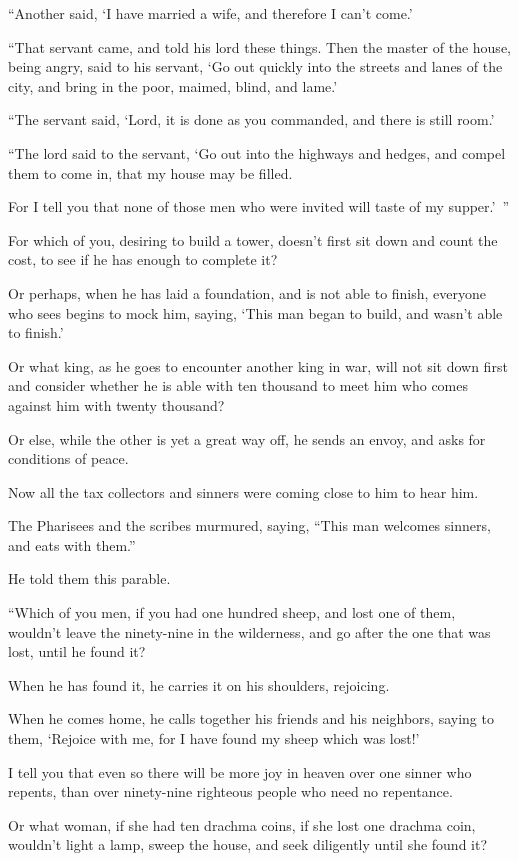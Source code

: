 “Another said, ‘I have married a wife, and therefore I can’t come.’

“That servant came, and told his lord these things. Then the master of the house, being angry, said to his servant, ‘Go out quickly into the streets and lanes of the city, and bring in the poor, maimed, blind, and lame.’

“The servant said, ‘Lord, it is done as you commanded, and there is still room.’

“The lord said to the servant, ‘Go out into the highways and hedges, and compel them to come in, that my house may be filled.

For I tell you that none of those men who were invited will taste of my supper.’ ”

For which of you, desiring to build a tower, doesn’t first sit down and count the cost, to see if he has enough to complete it?

Or perhaps, when he has laid a foundation, and is not able to finish, everyone who sees begins to mock him, saying, ‘This man began to build, and wasn’t able to finish.’

Or what king, as he goes to encounter another king in war, will not sit down first and consider whether he is able with ten thousand to meet him who comes against him with twenty thousand?

Or else, while the other is yet a great way off, he sends an envoy, and asks for conditions of peace.

Now all the tax collectors and sinners were coming close to him to hear him.

The Pharisees and the scribes murmured, saying, “This man welcomes sinners, and eats with them.”

He told them this parable.

“Which of you men, if you had one hundred sheep, and lost one of them, wouldn’t leave the ninety-nine in the wilderness, and go after the one that was lost, until he found it?

When he has found it, he carries it on his shoulders, rejoicing.

When he comes home, he calls together his friends and his neighbors, saying to them, ‘Rejoice with me, for I have found my sheep which was lost!’

I tell you that even so there will be more joy in heaven over one sinner who repents, than over ninety-nine righteous people who need no repentance.

Or what woman, if she had ten drachma coins, if she lost one drachma coin, wouldn’t light a lamp, sweep the house, and seek diligently until she found it?


